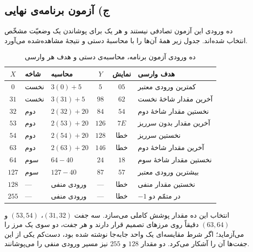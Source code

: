 \documentclass[12pt,a4paper]{article}
\begin{document}
	\subsection*{ج) آزمون برنامه‌ی نهایی}

	ده ورودی این آزمون تصادفی نیستند و هر یک برای پوشاندن یک وضعیّت مشخّص انتخاب شده‌اند. جدول زیر همهٔ آن‌ها را با محاسبهٔ دستی و نتیجهٔ مشاهده‌شده می‌آورد.

	\begin{table}[H]
		\centering
		\footnotesize
		\begin{tabular}{|c|l|l|c|c|l|}
			\hline
			\(X\) & \textbf{شاخه} & \textbf{محاسبه} & \(Y\) & \textbf{نمایش} & \textbf{هدف وارسی} \\ \hline
			\(0\)   & نخست & \(3(0)+5\)    & \(5\)   & \(05\) & کمترین ورودی معتبر \\ \hline
			\(31\)  & نخست & \(3(31)+5\)   & \(98\)  & \(62\) & آخرین مقدار شاخهٔ نخست \\ \hline
			\(32\)  & دوم  & \(2(32)+20\)  & \(84\)  & \(54\) & نخستین مقدار شاخهٔ دوم \\ \hline
			\(53\)  & دوم  & \(2(53)+20\)  & \(126\) & \(7E\) & آخرین مقدار بدون سرریز \\ \hline
			\(54\)  & دوم  & \(2(54)+20\)  & \(128\) & خطا & نخستین سرریز \\ \hline
			\(63\)  & دوم  & \(2(63)+20\)  & \(146\) & خطا & آخرین مقدار شاخهٔ دوم \\ \hline
			\(64\)  & سوم  & \(64-40\)     & \(24\)  & \(18\) & نخستین مقدار شاخهٔ سوم \\ \hline
			\(127\) & سوم  & \(127-40\)    & \(87\)  & \(57\) & بیشترین ورودی معتبر \\ \hline
			\(128\) & ---  & ورودی منفی    & ---     & خطا & نخستین مقدار منفی \\ \hline
			\(255\) & ---  & ورودی منفی    & ---     & خطا & \(-1\) در متمّم دو \\ \hline
		\end{tabular}
		\caption{ده ورودی آزمون برنامه، محاسبه‌ی دستی و هدف هر وارسی}
	\end{table}

	انتخاب این ده مقدار پوشش کاملی می‌سازد. سه جفت \((31,32)\)، \((53,54)\) و \((63,64)\) دقیقاً روی مرزهای تصمیم قرار دارند و هر جفت، دو سوی یک مرز را می‌آزماید؛ اگر شرط مقایسه‌ای یک واحد جابه‌جا نوشته شده بود، دست‌کم یکی از این جفت‌ها آن را آشکار می‌کرد. دو مقدار \(128\) و \(255\) نیز مسیر ورودی منفی را می‌پوشانند.
\end{document}
